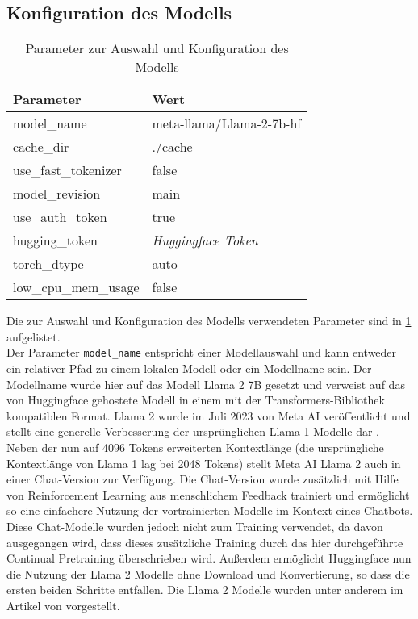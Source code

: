 \subsection{Konfiguration des Modells}
\begin{table}
    \centering
    \begin{tabular}{ll}
        \toprule
        \textbf{Parameter}   & \textbf{Wert}              \\
        \midrule
        model\_name          & meta-llama/Llama-2-7b-hf   \\
        cache\_dir           & ./cache                    \\
        use\_fast\_tokenizer & false                      \\
        model\_revision      & main                       \\
        use\_auth\_token     & true                       \\
        hugging\_token       & \textit{Huggingface Token} \\
        torch\_dtype         & auto                       \\
        low\_cpu\_mem\_usage & false                      \\
    \end{tabular}
    \caption{Parameter zur Auswahl und Konfiguration des Modells}\label{tab:model-config}
\end{table}
Die zur Auswahl und Konfiguration des Modells verwendeten Parameter sind in \cref{tab:model-config} aufgelistet.\\

Der Parameter \texttt{model\_name} entspricht einer Modellauswahl und kann entweder ein relativer Pfad zu einem lokalen Modell oder ein Modellname sein.
Der Modellname wurde hier auf das Modell Llama 2 7B gesetzt und verweist auf das von Huggingface gehostete Modell in einem mit der Transformers-Bibliothek kompatiblen Format.
Llama 2 wurde im Juli 2023 von Meta AI veröffentlicht und stellt eine generelle Verbesserung der ursprünglichen Llama 1 Modelle dar \citep{llama2}.
Neben der nun auf 4096 Tokens erweiterten Kontextlänge (die ursprüngliche Kontextlänge von Llama 1 lag bei 2048 Tokens) stellt Meta AI Llama 2 auch in einer Chat-Version zur Verfügung.
Die Chat-Version wurde zusätzlich mit Hilfe von Reinforcement Learning aus menschlichem Feedback trainiert und ermöglicht so eine einfachere Nutzung der vortrainierten Modelle im Kontext eines Chatbots.
Diese Chat-Modelle wurden jedoch nicht zum Training verwendet, da davon ausgegangen wird, dass dieses zusätzliche Training durch das hier durchgeführte Continual Pretraining überschrieben wird.
Außerdem ermöglicht Huggingface nun die Nutzung der Llama 2 Modelle ohne Download und Konvertierung, so dass die ersten beiden Schritte entfallen.
Die Llama 2 Modelle wurden unter anderem im Artikel von \citet{llama2} vorgestellt.\\

